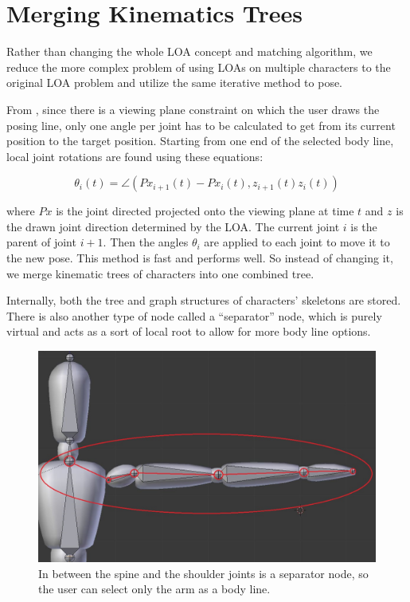 \section{Merging Kinematics Trees}
Rather than changing the whole LOA concept and matching algorithm, we reduce the more complex problem of using LOAs on multiple characters to the original LOA problem and utilize the same iterative method to pose.

From \citep{guay2015space}, since there is a viewing plane constraint on which the user draws the posing line, only one angle per joint has to be calculated to get from its current position to the target position. Starting from one end of the selected body line, local joint rotations are found using these equations:

\begin{equation}\label{eq:matching}
\theta_i(t) = \angle (Px_{i+1}(t) - Px_i(t), z_{i+1}(t)z_i(t)) 
\end{equation}

where $Px$ is the joint directed projected onto the viewing plane at time $t$ and $z$ is the drawn joint direction determined by the LOA. The current joint $i$ is the parent of joint $i+1$. Then the angles $\theta_i$ are applied to each joint to move it to the new pose. This method is fast and performs well. So instead of changing it, we merge kinematic trees of characters into one combined tree. 

Internally, both the tree and graph structures of characters' skeletons are stored. There is also another type of node called a ``separator'' node, which is purely virtual and acts as a sort of local root to allow for more body line options.

\begin{figure}[!h]
\centering
\includegraphics[scale=0.3]{img/shoulder}
\caption{In between the spine and the shoulder joints is a separator node, so the user can select only the arm as a body line.}
\end{figure}

